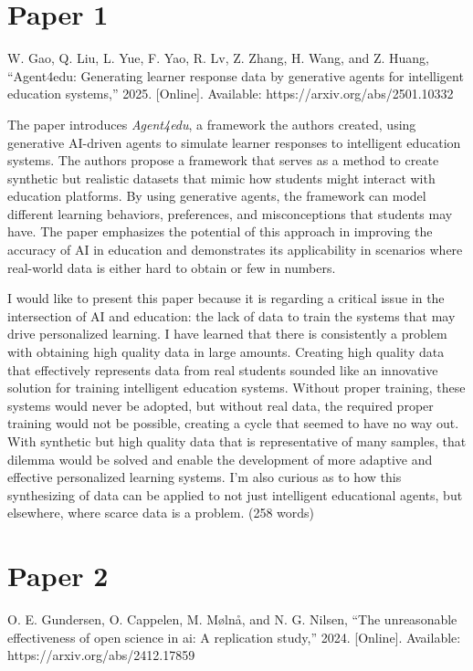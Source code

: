 \documentclass[12pt, letterpaper]{article}
\begin{document}
\pagestyle{empty}
\singlespacing
\vspace{1.0cm}

\newgeometry{} %


\section{Paper 1}
\label{sec:Paper 1}
W. Gao, Q. Liu, L. Yue, F. Yao, R. Lv, Z. Zhang, H. Wang, and Z. Huang, “Agent4edu: Generating learner response data by generative agents for intelligent education systems,” 2025. [Online]. Available: https://arxiv.org/abs/2501.10332

The paper introduces \emph{Agent4edu}, a framework the authors created, using generative AI-driven agents to simulate learner responses to intelligent education systems. The authors propose a framework that serves as a method to create synthetic but realistic datasets that mimic how students might interact with education platforms. By using generative agents, the framework can model different learning behaviors, preferences, and misconceptions that students may have. The paper emphasizes the potential of this approach in improving the accuracy of AI in education and demonstrates its applicability in scenarios where real-world data is either hard to obtain or few in numbers.

I would like to present this paper because it is regarding a critical issue in the intersection of AI and education: the lack of data to train the systems that may drive personalized learning. I have learned that there is consistently a problem with obtaining high quality data in large amounts. Creating high quality data that effectively represents data from real students sounded like an innovative solution for training intelligent education systems. Without proper training, these systems would never be adopted, but without real data, the required proper training would not be possible, creating a cycle that seemed to have no way out. With synthetic but high quality data that is representative of many samples, that dilemma would be solved and enable the development of more adaptive and effective personalized learning systems. I'm also curious as to how this synthesizing of data can be applied to not just intelligent educational agents, but elsewhere, where scarce data is a problem. (258 words)

\section{Paper 2}
\label{sec:Paper 2}
O. E. Gundersen, O. Cappelen, M. Mølnå, and N. G. Nilsen, “The unreasonable effectiveness of open science in ai: A replication study,” 2024. [Online]. Available: https://arxiv.org/abs/2412.17859
\end{document}
